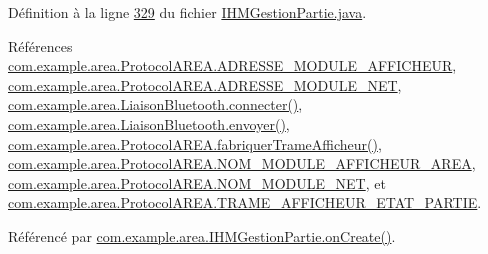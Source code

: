 Définition à la ligne \hyperlink{_i_h_m_gestion_partie_8java_source_l00329}{329} du fichier \hyperlink{_i_h_m_gestion_partie_8java_source}{I\+H\+M\+Gestion\+Partie.\+java}.



Références \hyperlink{_protocol_a_r_e_a_8java_source_l00028}{com.\+example.\+area.\+Protocol\+A\+R\+E\+A.\+A\+D\+R\+E\+S\+S\+E\+\_\+\+M\+O\+D\+U\+L\+E\+\_\+\+A\+F\+F\+I\+C\+H\+E\+UR}, \hyperlink{_protocol_a_r_e_a_8java_source_l00027}{com.\+example.\+area.\+Protocol\+A\+R\+E\+A.\+A\+D\+R\+E\+S\+S\+E\+\_\+\+M\+O\+D\+U\+L\+E\+\_\+\+N\+ET}, \hyperlink{_liaison_bluetooth_8java_source_l00136}{com.\+example.\+area.\+Liaison\+Bluetooth.\+connecter()}, \hyperlink{_liaison_bluetooth_8java_source_l00202}{com.\+example.\+area.\+Liaison\+Bluetooth.\+envoyer()}, \hyperlink{_protocol_a_r_e_a_8java_source_l00048}{com.\+example.\+area.\+Protocol\+A\+R\+E\+A.\+fabriquer\+Trame\+Afficheur()}, \hyperlink{_protocol_a_r_e_a_8java_source_l00026}{com.\+example.\+area.\+Protocol\+A\+R\+E\+A.\+N\+O\+M\+\_\+\+M\+O\+D\+U\+L\+E\+\_\+\+A\+F\+F\+I\+C\+H\+E\+U\+R\+\_\+\+A\+R\+EA}, \hyperlink{_protocol_a_r_e_a_8java_source_l00025}{com.\+example.\+area.\+Protocol\+A\+R\+E\+A.\+N\+O\+M\+\_\+\+M\+O\+D\+U\+L\+E\+\_\+\+N\+ET}, et \hyperlink{_protocol_a_r_e_a_8java_source_l00038}{com.\+example.\+area.\+Protocol\+A\+R\+E\+A.\+T\+R\+A\+M\+E\+\_\+\+A\+F\+F\+I\+C\+H\+E\+U\+R\+\_\+\+E\+T\+A\+T\+\_\+\+P\+A\+R\+T\+IE}.



Référencé par \hyperlink{_i_h_m_gestion_partie_8java_source_l00106}{com.\+example.\+area.\+I\+H\+M\+Gestion\+Partie.\+on\+Create()}.


